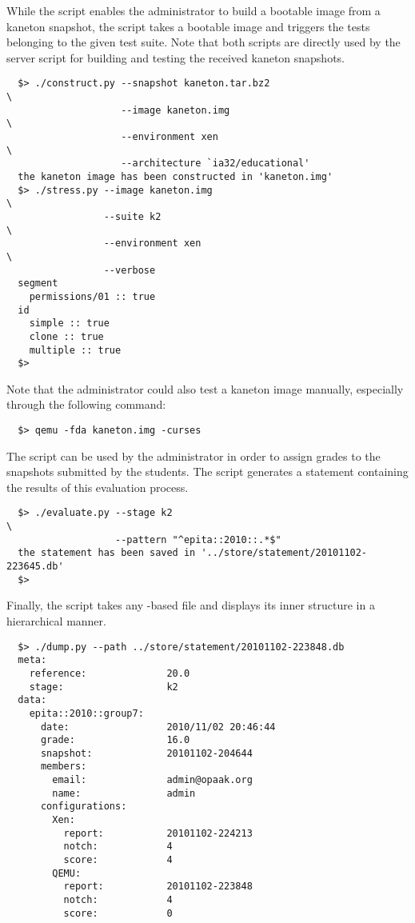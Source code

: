 While the  script enables the administrator to build a
bootable image from a kaneton snapshot, the  script takes
a bootable image and triggers the tests belonging to the given test
suite. Note that both scripts are directly used by the server script for
building and testing the received kaneton snapshots.

\begin{verbatim}
  $> ./construct.py --snapshot kaneton.tar.bz2                          \
                    --image kaneton.img                                 \
                    --environment xen                                   \
                    --architecture `ia32/educational'
  the kaneton image has been constructed in 'kaneton.img'
  $> ./stress.py --image kaneton.img                                    \
                 --suite k2                                             \
                 --environment xen                                      \
                 --verbose
  segment
    permissions/01 :: true
  id
    simple :: true
    clone :: true
    multiple :: true
  $> 
\end{verbatim}

Note that the administrator could also test a kaneton image manually,
especially through the following command:

\begin{verbatim}
  $> qemu -fda kaneton.img -curses
\end{verbatim}

The \name{evaluate} script can be used by the administrator in order
to assign grades to the snapshots submitted by the students. The script
generates a statement containing the results of this evaluation process.

\begin{verbatim}
  $> ./evaluate.py --stage k2                                           \
                   --pattern "^epita::2010::.*$"
  the statement has been saved in '../store/statement/20101102-223645.db'
  $> 
\end{verbatim}

Finally, the  script takes any -based file and
displays its inner structure in a hierarchical manner.

\begin{verbatim}
  $> ./dump.py --path ../store/statement/20101102-223848.db
  meta:
    reference:              20.0
    stage:                  k2
  data:
    epita::2010::group7:
      date:                 2010/11/02 20:46:44
      grade:                16.0
      snapshot:             20101102-204644
      members:
        email:              admin@opaak.org
        name:               admin
      configurations:
        Xen:
          report:           20101102-224213
          notch:            4
          score:            4
        QEMU:
          report:           20101102-223848
          notch:            4
          score:            0
\end{verbatim}

